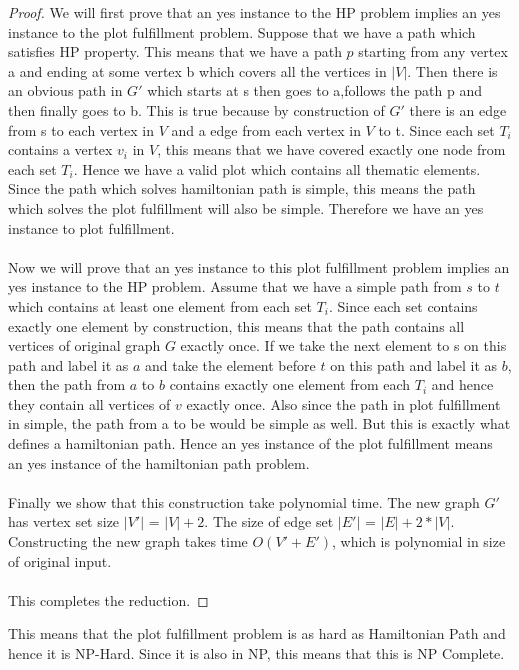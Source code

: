 \documentclass[11pt]{article}
\begin{document}
\begin{proof}
We will first prove that an yes instance to the HP problem implies an yes instance to the plot fulfillment problem. Suppose that we have a path which satisfies HP property. This means that we have a path $p$  starting from any vertex a and ending at some vertex b which covers all the vertices in $|V|$. Then there is an obvious path in $G'$ which starts at s then goes to a,follows the path p and then finally goes to b. This is true because by construction of $G'$ there is an edge from s to each vertex in $V$ and a edge from each vertex in $V$ to t. Since each set $T_i$ contains a vertex $v_i$ in $V$, this means that we have covered exactly one node from each set $T_i$. Hence we have a valid plot which contains all thematic elements. Since the path which solves hamiltonian path is simple, this means the path which solves the plot fulfillment will also be simple. Therefore we have an yes instance to plot fulfillment.\\\\
Now we will prove that an yes instance to this plot fulfillment problem implies an yes instance to the HP problem. Assume that we have a simple path from $s$ to $t$ which contains at least one element from each set $T_i$. Since each set contains exactly one element by construction, this means that the path contains all vertices of original graph $G$ exactly once. If we take the next element to s on this path and label it as $a$ and take the element before $t$ on this path and label it as $b$, then the path from $a$ to $b$ contains exactly one element from each $T_i$ and hence they contain all vertices of $v$ exactly once. Also since the path in plot fulfillment in simple, the path from a to be would be simple as well. But this is exactly what defines a hamiltonian path. Hence an yes instance of the plot fulfillment means an yes instance of the hamiltonian path problem.\\\\
Finally we show that this construction take polynomial time. The new graph $G'$ has vertex set size $|V'|$ = $|V| + 2$. The size of edge set $|E'|$ = $|E| + 2*|V|$. Constructing the new graph takes time $O( V' + E')$, which is polynomial in size of original input. \\\\
This completes the reduction.
\end{proof}
This means that the plot fulfillment problem is as hard as Hamiltonian Path and hence it is NP-Hard. Since it is also in NP, this means that this is NP Complete.
\end{document}
